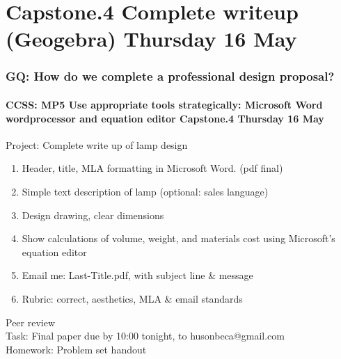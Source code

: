 \documentclass{beamer}
\begin{document}
\section{Capstone.4 Complete writeup (Geogebra) Thursday 16 May}
  \frame
  {
    \frametitle{GQ: How do we complete a professional design proposal?}
    \framesubtitle{CCSS: MP5 Use appropriate tools strategically: Microsoft Word wordprocessor and equation editor \hfill \alert{Capstone.4 Thursday 16 May}}

    \begin{block}{Project: Complete write up of lamp design}
      \begin{enumerate}
        \item Header, title, MLA formatting in Microsoft Word. (pdf final)
        \item Simple text description of lamp (optional: sales language)
        \item Design drawing, clear dimensions
        \item Show calculations of volume, weight, and materials cost using Microsoft's equation editor
        \item Email me: Last-Title.pdf, with subject line \& message
        \item Rubric: correct, aesthetics, MLA \& email standards
      \end{enumerate}
    \end{block}
    Peer review\\
    Task: Final paper due by 10:00 tonight, to husonbeca@gmail.com\\
    Homework: Problem set handout
  }
\end{document}
